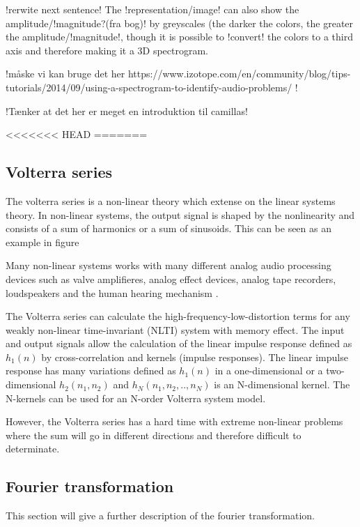 !rerwite next sentence!
The !representation/image! can also show the amplitude/!magnitude?(fra bog)! by greyscales (the darker the colors, the greater the amplitude/!magnitude!, though it is possible to !convert! the colors to a third axis and therefore making it a 3D spectrogram.   


!måske vi kan bruge det her
https://www.izotope.com/en/community/blog/tips-tutorials/2014/09/using-a-spectrogram-to-identify-audio-problems/
!

!Tænker at det her er meget en introduktion til camillas!


<<<<<<< HEAD
=======
\subsection{Volterra series}\label{sub:Volt}

The volterra series is a non-linear theory which extense on the linear systems theory. In non-linear systems, the output signal is shaped by the nonlinearity and consists of a sum of harmonics or a sum of sinusoids. This can be seen as an example in figure    


Many non-linear systems works with many different analog audio processing devices such as valve amplifieres, analog effect devices, analog tape recorders, loudspeakers and the human hearing mechanism .         

The Volterra series can calculate the high-frequency-low-distortion terms for any weakly non-linear time-invariant (NLTI) system with memory effect. The input and output signals allow the calculation of the linear impulse response defined as $h_1(n)$ by cross-correlation and kernels (impulse responses). The linear impulse response has many variations defined as $h_1(n)$ in a one-dimensional or a two-dimensional $h_2(n_1, n_2)$ and $h_N(n_1, n_2,.., n_N)$ is an N-dimensional kernel. The N-kernels can be used for an N-order Volterra system model. 

However, the Volterra series has a hard time with extreme non-linear problems where the sum will go in different directions and therefore difficult to determinate. 

\subsection{Fourier transformation}\label{sub:fourier}

This section will give a further description of the fourier transformation. 

